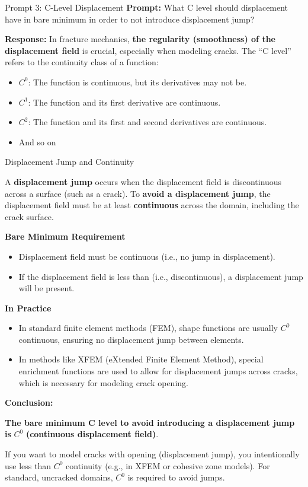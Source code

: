 \documentclass[12pt]{article}
\begin{document}
\begin{summarybox}{Prompt 3: C-Level Displacement}
\textbf{Prompt:} What C level should displacement have in bare minimum in order to not introduce displacement jump?
\vspace{1em}

\textbf{Response:}
In fracture mechanics, \textbf{the regularity (smoothness) of the displacement field} is crucial, especially when modeling cracks. The “C level” refers to the continuity class of a function:

\begin{itemize}
    \item $C^0$: The function is continuous, but its derivatives may not be.
    \item $C^1$: The function and its first derivative are continuous.
    \item $C^2$: The function and its first and second derivatives are continuous.
    \item And so on
\end{itemize}

Displacement Jump and Continuity

A \textbf{displacement jump} occurs when the displacement field is discontinuous 
across a surface (such as a crack). To \textbf{avoid a displacement jump}, the 
displacement field must be at least \textbf{continuous} across the domain, including the crack surface.

\vspace{1em}
\textbf{Bare Minimum Requirement}
\begin{itemize}
    \item Displacement field must be  continuous (i.e., no jump in displacement).
    \item If the displacement field is less than  (i.e., discontinuous), a displacement jump will be present.
\end{itemize}

\textbf{In Practice}
\begin{itemize}
    \item In standard finite element methods (FEM), shape functions are usually $C^0$ continuous, ensuring no displacement jump between elements.
    \item In methods like XFEM (eXtended Finite Element Method), special enrichment functions are used to allow for displacement jumps across cracks, which is necessary for modeling crack opening.
\end{itemize}

\textbf{Conclusion:}

\vspace{1em}

\textbf{The bare minimum C level to avoid introducing a displacement jump is} $C^0$ \textbf{(continuous displacement field)}.

If you want to model cracks with opening (displacement jump), you intentionally use less than $C^0$
  continuity (e.g., in XFEM or cohesive zone models). For standard, uncracked domains, $C^0$
  is required to avoid jumps.

\end{summarybox}
\end{document}

